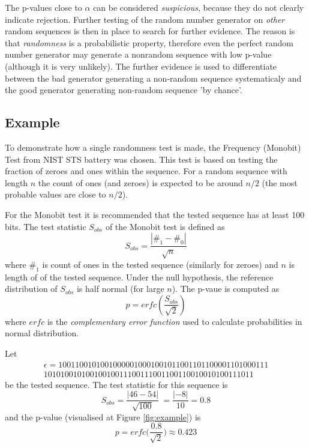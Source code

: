 \documentclass[
  digital,     %
  oneside,     %
  nosansbold,  %
  nocolorbold, %
  nolof,         %
  nolot,         %
]{fithesis4}
\begin{document}

The p-values close to $\alpha$ can be considered \emph{suspicious}, because they do not clearly indicate rejection. Further testing of the random number generator on \emph{other} random sequences is then in place to search for further evidence. \cite[p. 5]{tu01_paper} The reason is that \emph{randomness} is a probabilistic property, therefore even the perfect random number generator may generate a nonrandom sequence with low p-value (although it is very unlikely). The further evidence is used to differentiate between the bad generator generating a non-random sequence systematicaly and the good generator generating non-random sequence 'by chance'. \cite[p. 90]{tu01_guide}

\subsection{Example} \label{chap:rand-example}

To demonstrate how a single randomness test is made, the Frequency (Monobit) Test from NIST STS battery was chosen. \cite[p. 2-2]{nist_special} This test is based on testing the fraction of zeroes and ones within the sequence. For a random sequence with length $n$ the  count of ones (and zeroes) is expected to be around $n/2$ (the most probable values are close to $n/2$). 

For the Monobit test it is recommended that the tested sequence has at least 100 bits. The test statistic $S_{obs}$ of the Monobit test is defined as \[S_{obs} = \dfrac{|\#_1 - \#_0|}{\sqrt{n}}\] where $\#_1$ is count of ones in the tested sequence (similarly for zeroes) and $n$ is length of of the tested sequence. Under the null hypothesis, the reference distribution of $S_{obs}$ is half normal (for large $n$). The p-vaue is computed as \[ p = erfc(\dfrac{S_{obs}}{\sqrt{2}}) \] where $erfc$ is the \emph{complementary error function} used to calculate probabilities in normal distribution.

 Let
\[\begin{split}
    \epsilon = 10011001010010000010001001011001101100001101000111\\10101001010010010011100111001100110010010100111011
\end{split}\]
 be the tested sequence. The test statistic for this sequence is 
 \[S_{obs} = \dfrac{|46 - 54|}{\sqrt{100}}\ = \dfrac{|-8|}{10} = 0.8\]
 and the p-value (visualised at Figure \ref{fig:example}) is 
 \[p = erfc\biggl(\dfrac{0.8}{\sqrt{2}}\biggr) \approx 0.423\]
\end{document}
